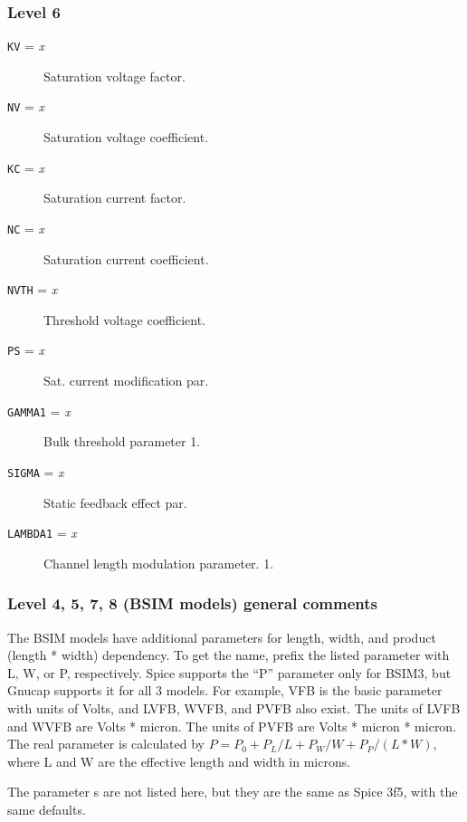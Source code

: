 \subsubsection{Level 6}
\begin{description}

\item[{\tt KV} = {\it x}]
Saturation voltage factor.

\item[{\tt NV} = {\it x}]
Saturation voltage coefficient.

\item[{\tt KC} = {\it x}]
Saturation current factor.

\item[{\tt NC} = {\it x}]
Saturation current coefficient.

\item[{\tt NVTH} = {\it x}]
Threshold voltage coefficient.

\item[{\tt PS} = {\it x}]
Sat. current modification  par.

\item[{\tt GAMMA1} = {\it x}]
Bulk threshold parameter 1.

\item[{\tt SIGMA} = {\it x}]
Static feedback effect par.

\item[{\tt LAMBDA1} = {\it x}]
Channel length modulation parameter. 1.

\end{description}
\subsubsection{Level 4, 5, 7, 8 (BSIM models) general comments}

The BSIM models have additional parameters for length, width, and
product (length * width) dependency.  To get the name, prefix the
listed parameter with L, W, or P, respectively.  Spice supports the
``P'' parameter only for BSIM3, but Gnucap supports it for all 3
models.  For example, VFB is the basic parameter with units of Volts,
and LVFB, WVFB, and PVFB also exist.  The units of LVFB and WVFB are
Volts * micron.  The units of PVFB are Volts * micron * micron.  The
real parameter is calculated by $P = P_0 + P_L / L + P_W / W + P_P /
(L*W)$, where L and W are the effective length and width in microns.

The parameter s are not listed here, but they are the same as Spice
3f5, with the same defaults.

